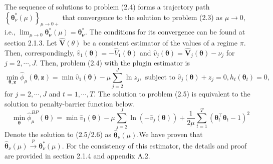 \documentclass{article}
\newcommand{\wh}{\widehat}
\newcommand{\itl}{\intercal}
\newcommand{\bs}{ \boldsymbol}
\newcommand{\lt}{\left}
\newcommand{\rt}{\right}
\begin{document}
The sequence of solutions to problem (2.4) forms a trajectory path $\lt\{\bs{\theta}^*_{\nu}(\mu)\rt\}_{\mu\to0+}$ that convergence to the solution to problem (2.3) as $\mu \to 0$, i.e., $\lim_{\mu \to 0}\bs{\theta}^*_{\bs{\nu}}(\mu)=\bs{\theta}^*_{\bs{\nu}}$. The conditions for its convergence can be found at section 2.1.3. Let $\wh{\bs{V}}(\theta)$ be a consistent estimator of the values of a regime $\pi$. Then, correspondingly, $\wh{v}_1(\bs{\theta}) = -\wh{V}_1(\bs{\theta})$ and $\wh{v}_j(\bs{\theta})=\wh{\bs{V}}_j(\bs{\theta}) -\nu_j$ for $j = 2, \cdots, J$. Then, problem (2.4) with the plugin estimator is
\begin{equation}
\min_{\bs{\theta}, \bs{z}} \wh{\phi}_{\mu}(\bs{\theta}, \bs{z}) = \min \wh{v}_1(\bs{\theta}) - \mu \sum_{j=2}^J \ln z_j, \text{ subject to}\,\, \wh{v}_j(\bs{\theta}) +z_j = 0, h_t(\bs{\theta}_t) = 0,
\end{equation}
for $j=2, \cdots, J$ and $t=1, \cdots, T$. The solution to problem (2.5) is equivalent to the solution to penalty-barrier function below. 
\begin{equation}
\min_{\bs{\theta}} \wh{\phi}^{BP}_{\mu}(\bs{\theta}) = \min \wh{v}_1(\bs{\theta}) - \mu \sum_{j=2}^J \ln (-\wh{v}_j(\bs{\theta})) + \frac{1}{2\mu}\sum_{t=1}^{T}(\bs{\theta}^{\itl}_t\bs{\theta}_t - 1)^2
\end{equation}
Denote the solution to (2.5/2.6) as $\wh{\bs{\theta}}_{\nu}(\mu)$.We have proven that $\wh{\bs{\theta}}_{\nu}(\mu) \overset{p}{\to} \bs{\theta}^*_{\nu}(\mu)$. For the consistency of this estimator, the details and proof are provided in section 2.1.4 and appendix A.2.
\end{document}

